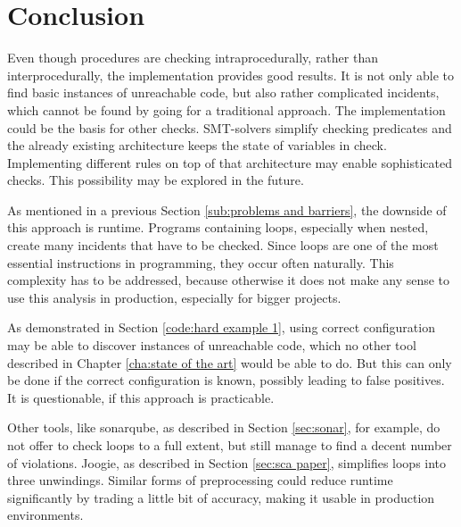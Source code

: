 
\chapter{Conclusion}
\label{cha:conclusion}

Even though procedures are checking intraprocedurally, rather than interprocedurally, the implementation provides good results. It is not only able to find basic instances of unreachable code, but also rather complicated incidents, which cannot be found by going for a traditional approach. 
The implementation could be the basis for other checks. SMT-solvers simplify checking predicates and the already existing architecture keeps the state of variables in check. 
Implementing different rules on top of that architecture may enable sophisticated checks.
This possibility may be explored in the future.


As mentioned in a previous Section \ref{sub:problems and barriers}, the downside of this approach is runtime. Programs containing loops, especially when nested, create many incidents that have to be checked. Since loops are one of the most essential instructions in programming, they occur often naturally. 
This complexity has to be addressed, because otherwise it does not make any sense to use this analysis in production, especially for bigger projects.


As demonstrated in Section \ref{code:hard example 1}, using correct configuration may be able to discover instances of unreachable code, which no other tool described in Chapter \ref{cha:state of the art} would be able to do. But this can only be done if the correct configuration is known, possibly leading to false positives. It is questionable, if this approach is practicable.


Other tools, like sonarqube, as described in Section \ref{sec:sonar}, for example, do not offer to check loops to a full extent, but still manage to find a decent number of violations. Joogie, as described in Section \ref{sec:sca paper}, simplifies loops into three unwindings. Similar forms of preprocessing could reduce runtime significantly by trading a little bit of accuracy, making it usable in production environments. 


